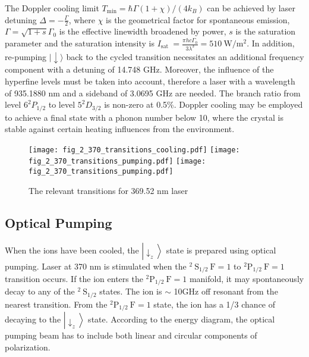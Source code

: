 The Doppler cooling limit $T_{\min }=\hbar \Gamma(1+\chi) /\left(4 k_B\right)$ can be achieved by laser detuning $\Delta=-\frac{\Gamma}{2}$, where $\chi$ is the geometrical factor for spontaneous emission, $\Gamma=\sqrt{1+s} \Gamma_0$ is the effective linewidth broadened by power, $s$ is the saturation parameter and the saturation intensity is $I_{\text {sat }}=\frac{\pi h c \Gamma_0}{3 \lambda^3}=510 \mathrm{~W} / \mathrm{m}^2$. In addition, re-pumping $|\downarrow\rangle$ back to the cycled transition necessitates an additional frequency component with a detuning of 14.748 GHz. Moreover, the influence of the hyperfine levels must be taken into account, therefore a laser with a wavelength of 935.1880 nm and a sideband of 3.0695 GHz are needed. The branch ratio from level $6^2 P_{1 / 2}$ to level $5^2 D_{3 / 2}$ is non-zero at 0.5\%. Doppler cooling may be employed to achieve a final state with a phonon number below 10, where the crystal is stable against certain heating influences from the environment.

\begin{figure}
    \centering
    {\texttt{[image: fig\_2\_370\_transitions\_cooling.pdf]}}
    {\texttt{[image: fig\_2\_370\_transitions\_pumping.pdf]}}
    {\texttt{[image: fig\_2\_370\_transitions\_pumping.pdf]}}
    \caption{The relevant transitions for 369.52 nm laser}
    \label{fig:370_transitions}
\end{figure}

\subsection{Optical Pumping}

When the ions have been cooled, the $\left|\downarrow_z\right\rangle$ state is prepared using optical pumping. Laser at 370 nm is stimulated when the ${ }^2 \mathrm{~S}_{1 / 2} \mathrm{~F}=1$ to ${ }^2 \mathrm{P}_{1 / 2} \mathrm{~F}=1$ transition occurs. If the ion enters the ${ }^2 \mathrm{P}_{1 / 2} \mathrm{~F}=1$ manifold, it may spontaneously decay to any of the ${ }^2 \mathrm{~S}_{1 / 2}$ states. The ion is $\sim$ 10GHz off resonant from the nearest transition. From the ${ }^2 \mathrm{P}_{1 / 2} \mathrm{~F}=1$ state, the ion has a 1/3 chance of decaying to the $\left|\downarrow_z\right\rangle$ state. According to the energy diagram, the optical pumping beam has to include both linear and circular components of polarization.

